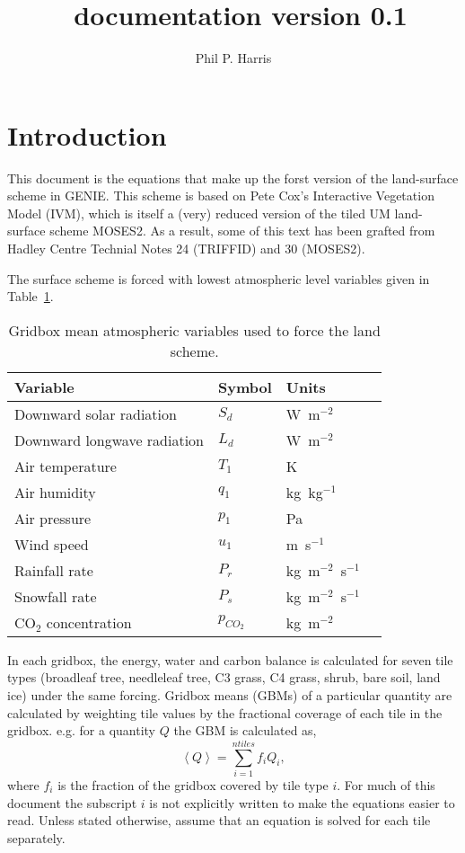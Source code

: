 \documentclass[a4paper]{article}
\title{\gnl\ documentation version 0.1}
\author{Phil P. Harris}
\newcommand{\gn}{GENIE}
\begin{document}
\maketitle
\tableofcontents
\newpage
\section{Introduction}\label{s:intro}
This document is the equations that make up the forst version of the
land-surface scheme in \gn.  This scheme is based on Pete Cox's
Interactive Vegetation Model (IVM), which is itself a (very) reduced
version of the tiled UM land-surface scheme MOSES2.  As a result, some
of this text has been grafted from Hadley Centre Technial Notes 24
(TRIFFID) and 30 (MOSES2).

The surface scheme is forced with lowest atmospheric level variables
given in Table~\ref{t:force}.
\begin{table}[hb]
\begin{center}
\begin{tabular}{llll}\hline
Variable & Symbol & Units \\ \hline
Downward solar radiation    & $S_d$ & W~m$^{-2}$ \\
Downward longwave radiation & $L_d$ & W~m$^{-2}$ \\
Air temperature             & $T_1$ & K \\
Air humidity                & $q_1$ & kg~kg$^{-1}$ \\
Air pressure                & $p_1$ & Pa \\
Wind speed                  & $u_1$ & m~s$^{-1}$ \\
Rainfall rate               & $P_r$ & kg~m$^{-2}$~s$^{-1}$ \\
Snowfall rate               & $P_s$ & kg~m$^{-2}$~s$^{-1}$ \\
CO$_2$ concentration        & $p_{CO_2}$ & kg~m$^{-2}$ \\ \hline
\end{tabular}
\caption{Gridbox mean atmospheric variables used to force the land scheme.}\label{t:force}
\end{center}
\end{table}
In each gridbox, the energy, water and carbon balance is calculated
for seven tile types (broadleaf tree, needleleaf tree, C3 grass, C4
grass, shrub, bare soil, land ice) under the same forcing. Gridbox
means (GBMs) of a particular quantity are calculated by weighting tile
values by the fractional coverage of each tile in the gridbox.
e.g. for a quantity $Q$ the GBM is calculated as,
\begin{equation}
  \left< Q \right> = \sum_{i=1}^{ntiles} f_i Q_i, \label{e:gbm}
\end{equation}
where $f_i$ is the fraction of the gridbox covered by tile type $i$.
For much of this document the subscript $i$ is not explicitly written
to make the equations easier to read.  Unless stated otherwise, assume
that an equation is solved for each tile separately.
\end{document}
